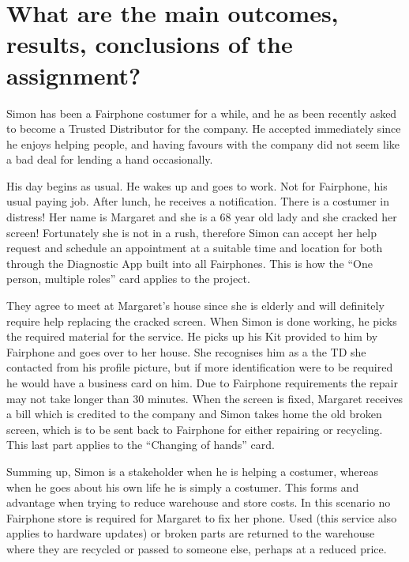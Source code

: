 \section{What are the main outcomes, results, conclusions of the assignment?}

Simon has been a Fairphone costumer for a while, and he as been recently asked to become a Trusted Distributor for the company.
 He accepted immediately since he enjoys helping people, and having favours with the company did not seem like a bad deal for lending a hand occasionally.
 

His day begins as usual.
 He wakes up and goes to work.
 Not for Fairphone, his usual paying job.
 After lunch, he receives a notification.
 There is a costumer in distress! Her name is Margaret and she is a 68 year old lady and she cracked her screen! Fortunately she is not in a rush, therefore Simon can accept her help request and schedule an appointment at a suitable time and location for both through the Diagnostic App built into all Fairphones.
 This is how the ``One person, multiple roles'' card applies to the project.
 

They agree to meet at Margaret's house since she is elderly and will definitely require help replacing the cracked screen.
 When Simon is done working, he picks the required material for the service.
 He picks up his Kit provided to him by Fairphone and goes over to her house.
 She recognises him as a the TD she contacted from his profile picture, but if more identification were to be required he would have a business card on him.
 Due to Fairphone requirements the repair may not take longer than 30 minutes.
 When the screen is fixed, Margaret receives a bill which is credited to the company and Simon takes home the old broken screen, which is to be sent back to Fairphone for either repairing or recycling.
 This last part applies to the ``Changing of hands'' card.
 

Summing up, Simon is a stakeholder when he is helping a costumer, whereas when he goes about his own life he is simply a costumer.
 This forms and advantage when trying to reduce warehouse and store costs.
 In this scenario no Fairphone store is required for Margaret to fix her phone.
 Used (this service also applies to hardware updates) or broken parts are returned to the warehouse where they are recycled or passed to someone else, perhaps at a reduced price.
 
